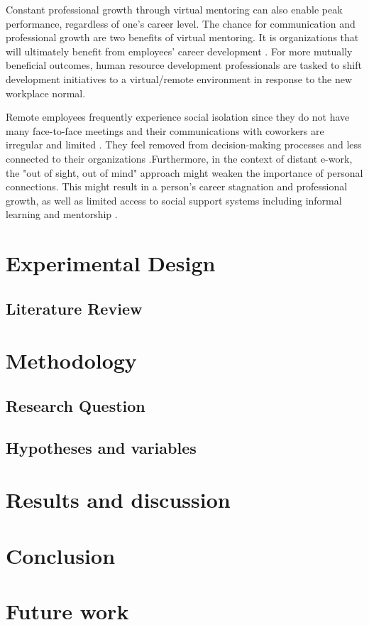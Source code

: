 \documentclass[12pt]{article}
\begin{document}
Constant professional growth through virtual mentoring can also enable peak performance, regardless of one's career level. The chance for communication and professional growth are two benefits of virtual mentoring. It is organizations that will ultimately benefit from employees’ career development \cite{Yarberry2021}.  For more mutually beneficial outcomes, human resource development professionals are tasked to shift development initiatives to a virtual/remote environment in response to the new workplace normal.

Remote employees frequently experience social isolation since they do not have many face-to-face meetings and their communications with coworkers are irregular and limited \cite{Park2021}. They feel removed from decision-making processes and less connected to their organizations \cite{Virick2010}.Furthermore, in the context of distant e-work, the "out of sight, out of mind" approach might weaken the importance of personal connections. This might result in a person's career stagnation and professional growth, as well as limited access to social support systems including informal learning and mentorship \cite{Smith2018}.


\section*{Experimental Design}


\subsection{Literature Review}


\section{Methodology}
\subsection{Research Question}

\subsection{Hypotheses and variables}

\section{Results and discussion}
\section{Conclusion}
\section{Future work}







\end{document}
